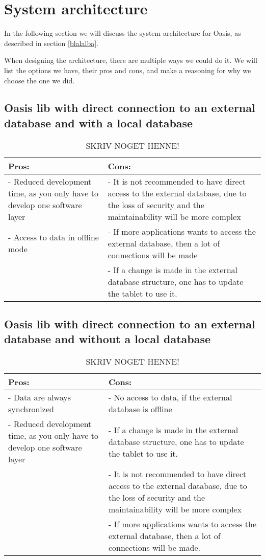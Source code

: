 \section{System architecture}
In the following section we will discuss the system architecture for Oasis, as described in section \vref{blalalba}.

When designing the architecture, there are multiple ways we could do it. We will list the options we have, their pros and cons, and make a reasoning for why we choose the one we did.

\subsection{Oasis lib with direct connection to an external database and with a local database}
\begin{table}[htbp]
	\centering
		\begin{tabular}{| p{9cm} | m{9cm} |}
			\hline
			Pros: & Cons: \\ \hline
			- Reduced development time, as you only have to develop one software layer & - It is not recommended to have direct access to the external database, due to the loss of security and the maintainability will be more complex \\ \hline
			- Access to data in offline mode & - If more applications wants to access the external database, then a lot of connections will be made\\ \hline
			& - If a change is made in the external database structure, one has to update the tablet to use it. \\ \hline
		\end{tabular}
	\caption{SKRIV NOGET HENNE!}
	\label{tab:procon1}
\end{table}

\subsection{Oasis lib with direct connection to an external database and without a local database}
\begin{table}[htbp]
	\centering
		\begin{tabular}{| p{9cm} | m{9cm} |}
			\hline
			Pros: & Cons: \\ \hline
			- Data are always synchronized & - No access to data, if the external database is offline \\ \hline
			- Reduced development time, as you only have to develop one software layer & - If a change is made in the external database structure, one has to update the tablet to use it. \\ \hline
			& - It is not recommended to have direct access to the external database, due to the loss of security and the maintainability will be more complex \\ \hline
			& - If more applications wants to access the external database, then a lot of connections will be made. \\ \hline
		\end{tabular}
	\caption{SKRIV NOGET HENNE!}
	\label{tab:procon2}
\end{table}
	
